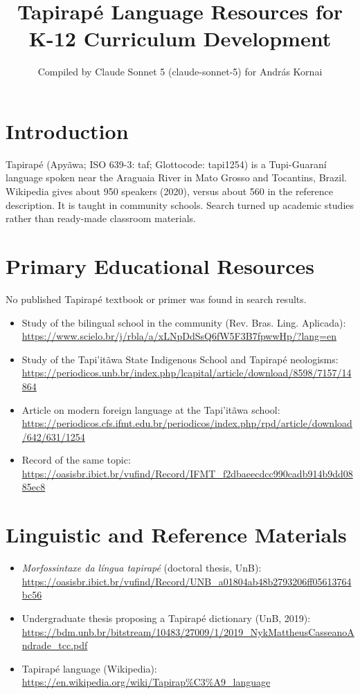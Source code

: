 \documentclass[12pt]{article}
\title{Tapirap\'e Language Resources for K-12 Curriculum Development}
\author{Compiled by Claude Sonnet 5 (claude-sonnet-5) for Andr\'as Kornai}
\date{}
\begin{document}
\maketitle

\section{Introduction}
Tapirap\'e (Apy\~awa; ISO 639-3: taf; Glottocode: tapi1254) is a Tupi-Guaran\'i language spoken near the Araguaia River in Mato Grosso and Tocantins, Brazil. Wikipedia gives about 950 speakers (2020), versus about 560 in the reference description. It is taught in community schools. Search turned up academic studies rather than ready-made classroom materials.

\section{Primary Educational Resources}
No published Tapirap\'e textbook or primer was found in search results.
\begin{itemize}
\item Study of the bilingual school in the community (Rev. Bras. Ling. Aplicada): \url{https://www.scielo.br/j/rbla/a/xLNpDdSsQ6fW5F3B7fpwwHp/?lang=en}
\item Study of the Tapi'it\~awa State Indigenous School and Tapirap\'e neologisms: \url{https://periodicos.unb.br/index.php/lcapital/article/download/8598/7157/14864}
\item Article on modern foreign language at the Tapi'it\~awa school: \url{https://periodicos.cfs.ifmt.edu.br/periodicos/index.php/rpd/article/download/642/631/1254}
\item Record of the same topic: \url{https://oasisbr.ibict.br/vufind/Record/IFMT_f2dbaeecdcc990cadb914b9dd0885ec8}
\end{itemize}

\section{Linguistic and Reference Materials}
\begin{itemize}
\item \emph{Morfossintaxe da l\'ingua tapirap\'e} (doctoral thesis, UnB): \url{https://oasisbr.ibict.br/vufind/Record/UNB_a01804ab48b2793206ff05613764bc56}
\item Undergraduate thesis proposing a Tapirap\'e dictionary (UnB, 2019): \url{https://bdm.unb.br/bitstream/10483/27009/1/2019_NykMattheusCasseanoAndrade_tcc.pdf}
\item Tapirap\'e language (Wikipedia): \url{https://en.wikipedia.org/wiki/Tapirap%C3%A9_language}
\end{itemize}
\end{document}
